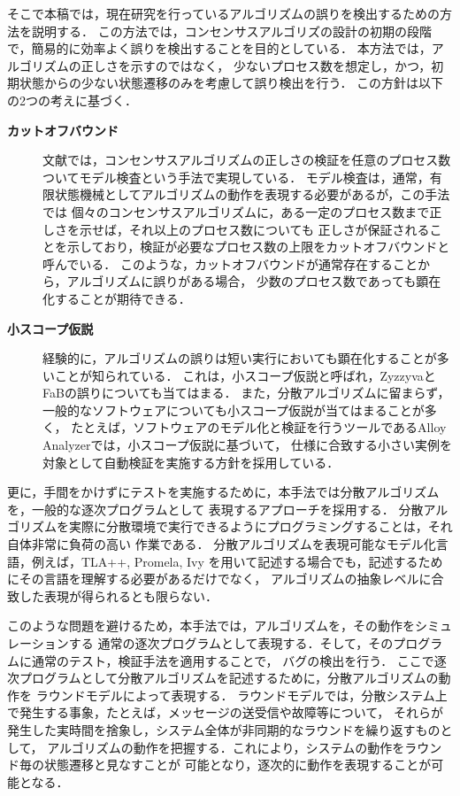 \documentclass[technicalreport]{ieicej}
\theoremstyle{plain}
\begin{document}
そこで本稿では，現在研究を行っているアルゴリズムの誤りを検出するための方法を説明する．
この方法では，コンセンサスアルゴリズの設計の初期の段階で，簡易的に効率よく誤りを検出することを目的としている．
本方法では，アルゴリズムの正しさを示すのではなく，
少ないプロセス数を想定し，かつ，初期状態からの少ない状態遷移のみを考慮して誤り検出を行う．
この方針は以下の2つの考えに基づく．
\begin{description}
\item[\textbf{カットオフバウンド}]
文献\cite{MaricSB17}では，コンセンサスアルゴリズムの正しさの検証を任意のプロセス数ついてモデル検査という手法で実現している．
モデル検査は，通常，有限状態機械としてアルゴリズムの動作を表現する必要があるが，この手法では
個々のコンセンサスアルゴリズムに，ある一定のプロセス数まで正しさを示せば，それ以上のプロセス数についても
正しさが保証されることを示しており，検証が必要なプロセス数の上限をカットオフバウンドと呼んでいる．
このような，カットオフバウンドが通常存在することから，アルゴリズムに誤りがある場合，
少数のプロセス数であっても顕在化することが期待できる．

\item[\textbf{小スコープ仮説}]
経験的に，アルゴリズムの誤りは短い実行においても顕在化することが多いことが知られている．
これは，小スコープ仮説と呼ばれ，ZyzzyvaとFaBの誤りについても当てはまる．
また，分散アルゴリズムに留まらず，一般的なソフトウェアについても小スコープ仮説が当てはまることが多く，
たとえば，ソフトウェアのモデル化と検証を行うツールであるAlloy Analyzerでは，小スコープ仮説に基づいて，
仕様に合致する小さい実例を対象として自動検証を実施する方針を採用している．
\end{description}

更に，手間をかけずにテストを実施するために，本手法では分散アルゴリズムを，一般的な逐次プログラムとして
表現するアプローチを採用する．
分散アルゴリズムを実際に分散環境で実行できるようにプログラミングすることは，それ自体非常に負荷の高い
作業である．
分散アルゴリズムを表現可能なモデル化言語，例えば，TLA++\cite{}, Promela\cite{spinbook}, Ivy
を用いて記述する場合でも，記述するためにその言語を理解する必要があるだけでなく，
アルゴリズムの抽象レベルに合致した表現が得られるとも限らない．

このような問題を避けるため，本手法では，アルゴリズムを，その動作をシミュレーションする
通常の逐次プログラムとして表現する．そして，そのプログラムに通常のテスト，検証手法を適用することで，
バグの検出を行う．
ここで逐次プログラムとして分散アルゴリズムを記述するために，分散アルゴリズムの動作を
ラウンドモデルによって表現する．
ラウンドモデルでは，分散システム上で発生する事象，たとえば，メッセージの送受信や故障等について，
それらが発生した実時間を捨象し，システム全体が非同期的なラウンドを繰り返すものとして，
アルゴリズムの動作を把握する．これにより，システムの動作をラウンド毎の状態遷移と見なすことが
可能となり，逐次的に動作を表現することが可能となる．
\end{document}
